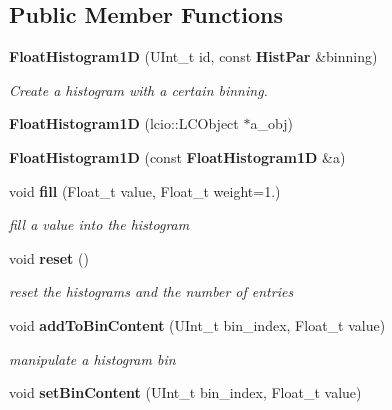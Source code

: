 \subsection*{Public Member Functions}
\begin{DoxyCompactItemize}
\item 
{\bf FloatHistogram1D} (UInt\_\-t id, const {\bf HistPar} \&binning)
\begin{DoxyCompactList}\small\item\em Create a histogram with a certain binning. \item\end{DoxyCompactList}\item 
{\bfseries FloatHistogram1D} (lcio::LCObject $\ast$a\_\-obj)\label{classhistmgr_1_1FloatHistogram1D_a1032bc84dcbaa4a6210fb0ee6b5088d7}

\item 
{\bfseries FloatHistogram1D} (const {\bf FloatHistogram1D} \&a)\label{classhistmgr_1_1FloatHistogram1D_af31379e3a83520eac73d5c1609002303}

\item 
void {\bf fill} (Float\_\-t value, Float\_\-t weight=1.)\label{classhistmgr_1_1FloatHistogram1D_aef71989b1c5ad2fc370ee96fb4022213}

\begin{DoxyCompactList}\small\item\em fill a value into the histogram \item\end{DoxyCompactList}\item 
void {\bf reset} ()\label{classhistmgr_1_1FloatHistogram1D_ab6020a2d0902ddc0d6b6f21ae6c579d9}

\begin{DoxyCompactList}\small\item\em reset the histograms and the number of entries \item\end{DoxyCompactList}\item 
void {\bf addToBinContent} (UInt\_\-t bin\_\-index, Float\_\-t value)\label{classhistmgr_1_1FloatHistogram1D_ad0af3ba0d429ed031d43def85d3ca602}

\begin{DoxyCompactList}\small\item\em manipulate a histogram bin \item\end{DoxyCompactList}\item 
void {\bf setBinContent} (UInt\_\-t bin\_\-index, Float\_\-t value)\label{classhistmgr_1_1FloatHistogram1D_a7c3aa74ff2e33c25678d73a0e127ef9f}


\end{DoxyCompactItemize}
